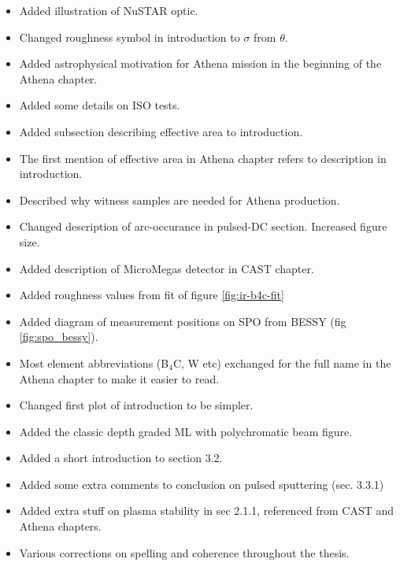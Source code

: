 \begin{itemize}
  \item Added illustration of NuSTAR optic.
  \item Changed roughness symbol in introduction to $\sigma$ from $\theta$.
  \item Added astrophysical motivation for Athena mission in the beginning of the Athena chapter.
  \item Added some details on ISO tests.
  \item Added subsection describing effective area to introduction.
  \item The first mention of effective area in Athena chapter refers to description in introduction.
  \item Described why witness samples are needed for Athena production.
  \item Changed description of arc-occurance in pulsed-DC section. Increased figure size.
  \item Added description of MicroMegas detector in CAST chapter.
  \item Added roughness values from fit of figure \ref{fig:ir-b4c-fit}
  \item Added diagram of measurement positions on SPO from BESSY (fig \ref{fig:spo_bessy}).
  \item Most element abbreviations (B$_4$C, W etc) exchanged for the full name in the Athena chapter to make it easier to read.
  \item Changed first plot of introduction to be simpler.
  \item Added the classic depth graded ML with polychromatic beam figure.
  \item Added a short introduction to section 3.2.
  \item Added some extra comments to conclusion on pulsed sputtering (sec. 3.3.1)
  \item Added extra stuff on plasma stability in sec 2.1.1, referenced from CAST and Athena chapters. 

  \item Various corrections on spelling and coherence throughout the thesis.
\end{itemize}

